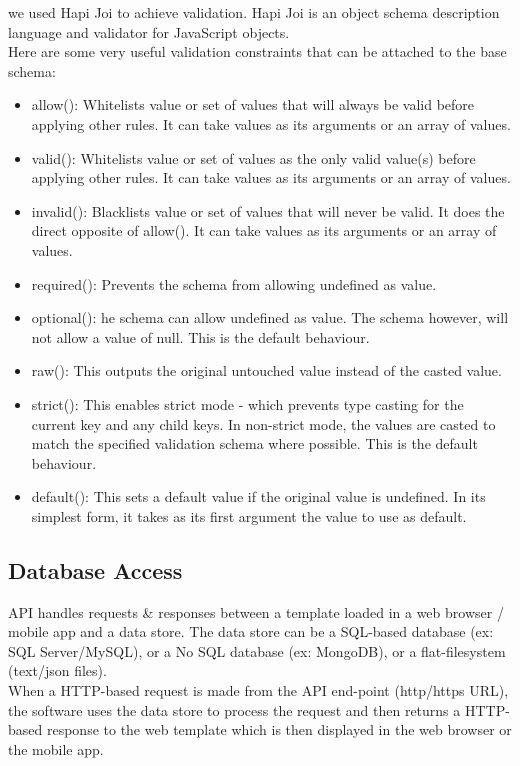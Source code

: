 we used Hapi Joi to achieve validation.
Hapi Joi is an object schema description language and validator for JavaScript objects.\\
Here are some very useful validation constraints that can be attached to the base schema:
\begin{itemize}
    \item allow(): Whitelists value or set of values that will always be valid before applying other rules. It can take values as its arguments or an array of values.
    \item valid(): Whitelists value or set of values as the only valid value(s) before applying other rules. It can take values as its arguments or an array of values.
    \item invalid(): Blacklists value or set of values that will never be valid. It does the direct opposite of allow(). It can take values as its arguments or an array of values.
    \item required(): Prevents the schema from allowing undefined as value.
    \item optional(): he schema can allow undefined as value. The schema however, will not allow a value of null. This is the default behaviour.
    \item raw(): This outputs the original untouched value instead of the casted value.
    \item strict(): This enables strict mode - which prevents type casting for the current key and any child keys. In non-strict mode, the values are casted to match the specified validation schema where possible. This is the default behaviour.
    \item default(): This sets a default value if the original value is undefined. In its simplest form, it takes as its first argument the value to use as default.\cite{AF0}
\end{itemize}

\subsection{Database Access}

\hspace{2cm}API handles requests & responses between a template loaded in a web browser / mobile app and a data store.
The data store can be a SQL-based database (ex: SQL Server/MySQL), or a No SQL database (ex: MongoDB), or a flat-filesystem (text/json files).\\
When a HTTP-based request is made from the API end-point (http/https URL), the software uses the data store to process the request and then returns a HTTP-based response to the web template which is then displayed in the web browser or the mobile app.

